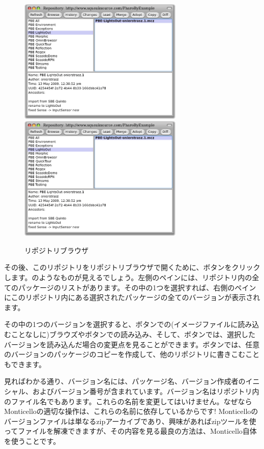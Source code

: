 \documentclass[a4paper,10pt,twoside]{book}
\begin{document}
\begin{figure}[btp]
\begin{center}
\ifluluelse
{\includegraphics[width=0.7\textwidth]{SqueakSource-PBE}}
{\includegraphics[width=0.7\textwidth]{SqueakSource-PBE}}
\end{center}
\caption{リポジトリブラウザ}
\end{figure}
\noindent
その後、このリポジトリをリポジトリブラウザで開くために、ボタンをクリックします。のようなものが見えるでしょう。左側のペインには、リポジトリ内の全てのパッケージのリストがあります。その中の1つを選択すれば、右側のペインにこのリポジトリ内にある選択されたパッケージの全てのバージョンが表示されます。

その中の1つのバージョンを選択すると、ボタンでの(イメージファイルに読み込むことなしに)ブラウズやボタンでの読み込み、そして、ボタンでは、選択したバージョンを読み込んだ場合の変更点を見ることができます。ボタンでは、任意のバージョンのパッケージのコピーを作成して、他のリポジトリに書きこむこともできます。

見ればわかる通り、バージョン名には、パッケージ名、バージョン作成者のイニシャル、およびバージョン番号が含まれています。バージョン名はリポジトリ内のファイル名でもあります。これらの名前を変更してはいけません。なぜならMonticelloの適切な操作は、これらの名前に依存しているからです! Monticelloのバージョンファイルは単なるzipアーカイブであり、興味があればzipツールを使ってファイルを解凍できますが、その内容を見る最良の方法は、Monticello自体を使うことです。
\end{document}
